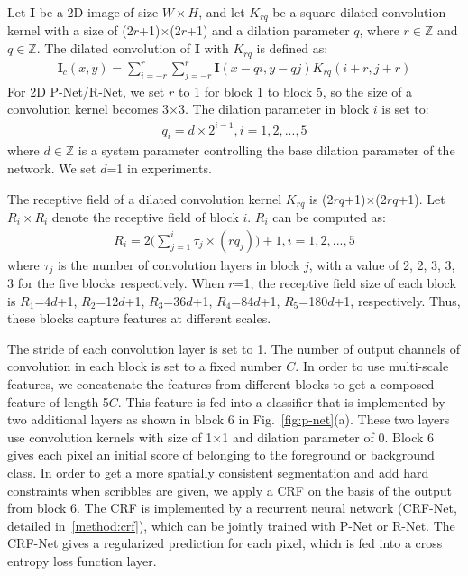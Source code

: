 \documentclass[10pt,journal,compsoc]{IEEEtran}
\begin{document}
Let $\mathbf{I}$ be a 2D image of size $W\times H$, and let $K_{rq}$ be a square dilated convolution kernel with a size of (2$r$+1)$\times$(2$r$+1) and a dilation parameter $q$, where $r\in \mathbb{Z}$ and $q\in \mathbb{Z}$. The dilated convolution of $\mathbf{I}$ with $K_{rq}$ is defined as:
\begin{align}
\mathbf{I}_c(x,y)= \sum_{i=-r}^{r}\sum_{j=-r}^{r}\mathbf{I}(x-qi, y-qj)K_{rq}(i+r,j+r) 
\label{eq:dilated_convolution}
\end{align}
For 2D P-Net/R-Net, we set $r$ to 1 for block 1 to block 5, so the size of a convolution kernel becomes 3$\times$3. The dilation parameter in block $i$ is set to:
\begin{align}
q_i= d\times2^{i-1},  i=1,2,..., 5
\label{eq:dilated_factor}
\end{align}
 where $d \in \mathbb{Z}$ is a system parameter controlling the base dilation parameter of the network. We set $d$=1 in experiments.

The receptive field of a dilated convolution kernel $K_{rq}$ is (2$rq$+1)$\times$(2$rq$+1). Let $R_i\times R_i$ denote the receptive field of block $i$.  $R_i$ can be computed as:  
\begin{align}
	R_i = 2\Big(\sum_{j=1}^{i}{\tau_j \times (rq_j)\Big)}+1, i=1,2,...,5
	\label{eq:receptive_field}
\end{align}
where $\tau_j$ is the number of convolution layers in block $j$, with a value of 2, 2, 3, 3, 3 for the five blocks respectively.  
When $r$=1, the receptive field size of each block is $R_1$=4$d$+1, $R_2$=12$d$+1, $R_3$=36$d$+1, $R_4$=84$d$+1, $R_5$=180$d$+1, respectively. Thus, these blocks capture features at different scales. 

The stride of each convolution layer is set to 1. The number of output channels of convolution in each block is set to a fixed number $C$. In order to use multi-scale features, we concatenate the features from different blocks to get a composed feature of length 5$C$. This feature is fed into a classifier that is implemented by two additional layers as shown  in block 6 in Fig.~\ref{fig:p-net}(a). These two layers use  convolution kernels with size of 1$\times$1 and dilation parameter of 0. Block 6 gives each pixel an initial score of belonging to the foreground or background class. In order to get a more spatially consistent segmentation and add hard constraints when scribbles are given, we apply a CRF on the basis of the output from block 6. The CRF is implemented by a recurrent neural network (CRF-Net, detailed in~\ref{method:crf}), which can be jointly trained with P-Net or R-Net. The CRF-Net gives a regularized prediction for each pixel, which is fed into a cross entropy loss function layer.
\end{document}

